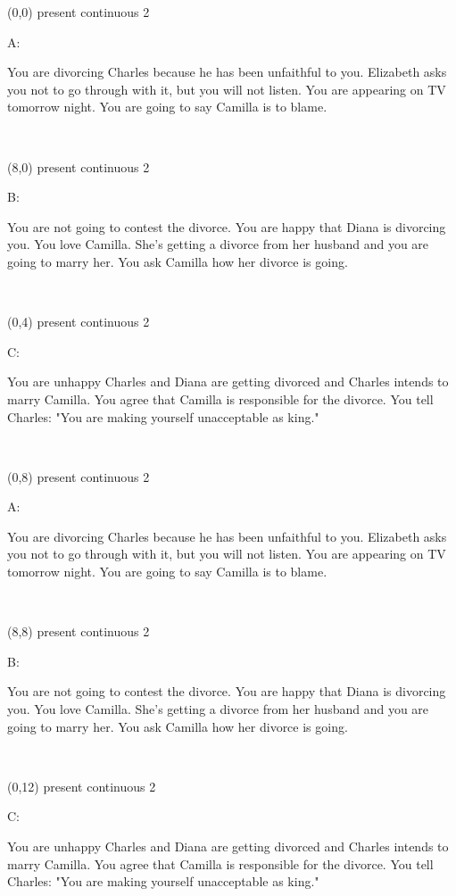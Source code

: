 \documentclass[a4paper]{article}
\newcommand{\myIdentifier}[0]{
present continuous 2
}
\newcommand{\myAcontent}[0]{
You are divorcing Charles because he has been unfaithful to you. Elizabeth asks you not to go through with it, but you will not listen. You are appearing on TV tomorrow night. You are going to say Camilla is to blame.
}
\newcommand{\myBcontent}[0]{
You are not going to contest the divorce. You are happy that Diana is divorcing you. You love Camilla. She's getting a divorce from her husband and you are going to marry her. You ask Camilla how her divorce is going.
}
\newcommand{\myCcontent}[0]{
You are unhappy Charles and Diana are getting divorced and Charles intends to marry Camilla. You agree that Camilla is responsible for the divorce. You tell Charles: "You are making yourself unacceptable as king."
}
\newcommand{\mycard}[5]{%
	\vspace{0.1cm}
	\small #1 #2
	\par
	\parbox[t][6.7cm][c]{9.5cm}{%
	\hspace{0.1cm} \Large#3\\
	\normalsize#4 #5
	}
}
\begin{document}
\selectfont

\begin{textblock}{8}(0,0)
\mycard{}{\myIdentifier}{\parbox{9.0cm}{A:
\myAcontent
}}{}{} 
\end{textblock}

\begin{textblock}{8}(8,0)
\mycard{}{\myIdentifier}{\parbox{9.0cm}{B:
\myBcontent
}}{}{} 
\end{textblock}

\begin{textblock}{8}(0,4)
\mycard{}{\myIdentifier}{\parbox{9.0cm}{C:
\myCcontent
}}{}{} 
\end{textblock}

\begin{textblock}{8}(0,8)
\mycard{}{\myIdentifier}{\parbox{9.0cm}{A:
\myAcontent
}}{}{} 
\end{textblock}

\begin{textblock}{8}(8,8)
\mycard{}{\myIdentifier}{\parbox{9.0cm}{B:
\myBcontent
}}{}{} 
\end{textblock}

\begin{textblock}{8}(0,12)
\mycard{}{\myIdentifier}{\parbox{9.0cm}{C:
\myCcontent
}}{}{} 
\end{textblock}
\end{document}
